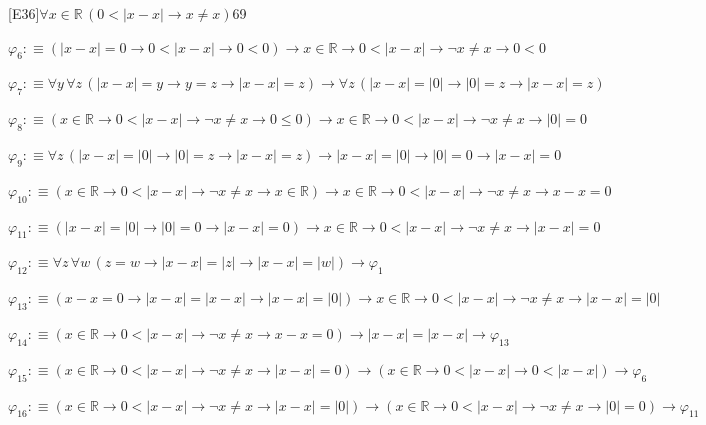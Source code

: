 \begin{fullproof}{[E36]}{$\forall x \in \mathbb{R}\,(0 < \lvert x - x \rvert \to x \neq x)$}{69}
\begin{abbrevlist}
\item $\varphi_{6} :\equiv (\lvert x - x \rvert = 0 \to 0 < \lvert x - x \rvert \to 0 < 0) \to x \in \mathbb{R} \to 0 < \lvert x - x \rvert \to \neg x \neq x \to 0 < 0$
\item $\varphi_{7} :\equiv \forall y\,\forall z\,(\lvert x - x \rvert = y \to y = z \to \lvert x - x \rvert = z) \to \forall z\,(\lvert x - x \rvert = \lvert 0 \rvert \to \lvert 0 \rvert = z \to \lvert x - x \rvert = z)$
\item $\varphi_{8} :\equiv (x \in \mathbb{R} \to 0 < \lvert x - x \rvert \to \neg x \neq x \to 0 \leq 0) \to x \in \mathbb{R} \to 0 < \lvert x - x \rvert \to \neg x \neq x \to \lvert 0 \rvert = 0$
\item $\varphi_{9} :\equiv \forall z\,(\lvert x - x \rvert = \lvert 0 \rvert \to \lvert 0 \rvert = z \to \lvert x - x \rvert = z) \to \lvert x - x \rvert = \lvert 0 \rvert \to \lvert 0 \rvert = 0 \to \lvert x - x \rvert = 0$
\item $\varphi_{10} :\equiv (x \in \mathbb{R} \to 0 < \lvert x - x \rvert \to \neg x \neq x \to x \in \mathbb{R}) \to x \in \mathbb{R} \to 0 < \lvert x - x \rvert \to \neg x \neq x \to x - x = 0$
\item $\varphi_{11} :\equiv (\lvert x - x \rvert = \lvert 0 \rvert \to \lvert 0 \rvert = 0 \to \lvert x - x \rvert = 0) \to x \in \mathbb{R} \to 0 < \lvert x - x \rvert \to \neg x \neq x \to \lvert x - x \rvert = 0$
\item $\varphi_{12} :\equiv \forall z\,\forall w\,(z = w \to \lvert x - x \rvert = \lvert z \rvert \to \lvert x - x \rvert = \lvert w \rvert) \to \varphi_{1}$
\item $\varphi_{13} :\equiv (x - x = 0 \to \lvert x - x \rvert = \lvert x - x \rvert \to \lvert x - x \rvert = \lvert 0 \rvert) \to x \in \mathbb{R} \to 0 < \lvert x - x \rvert \to \neg x \neq x \to \lvert x - x \rvert = \lvert 0 \rvert$
\item $\varphi_{14} :\equiv (x \in \mathbb{R} \to 0 < \lvert x - x \rvert \to \neg x \neq x \to x - x = 0) \to \lvert x - x \rvert = \lvert x - x \rvert \to \varphi_{13}$
\item $\varphi_{15} :\equiv (x \in \mathbb{R} \to 0 < \lvert x - x \rvert \to \neg x \neq x \to \lvert x - x \rvert = 0) \to (x \in \mathbb{R} \to 0 < \lvert x - x \rvert \to 0 < \lvert x - x \rvert) \to \varphi_{6}$
\item $\varphi_{16} :\equiv (x \in \mathbb{R} \to 0 < \lvert x - x \rvert \to \neg x \neq x \to \lvert x - x \rvert = \lvert 0 \rvert) \to (x \in \mathbb{R} \to 0 < \lvert x - x \rvert \to \neg x \neq x \to \lvert 0 \rvert = 0) \to \varphi_{11}$
\end{abbrevlist}
\end{fullproof}
